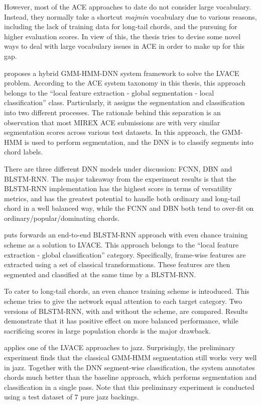 However, most of the ACE approaches to date do not consider large vocabulary. Instead, they normally take a shortcut \textit{majmin} vocabulary due to various reasons, including the lack of training data for long-tail chords, and the pursuing for higher evaluation scores. In view of this, the thesis tries to devise some novel ways to deal with large vocabulary issues in ACE in order to make up for this gap.

 proposes a hybrid GMM-HMM-DNN system framework to solve the LVACE problem. According to the ACE system taxonomy in this thesis, this approach belongs to the ``local feature extraction - global segmentation - local classification'' class. Particularly, it assigns the segmentation and classification into two different processes. The rationale behind this separation is an observation that most MIREX ACE submissions are with very similar segmentation scores across various test datasets. In this approach, the GMM-HMM is used to perform segmentation, and the DNN is to classify segments into chord labels.

There are three different DNN models under discussion: FCNN, DBN and BLSTM-RNN. The major takeaway from the experiment results is that the BLSTM-RNN implementation has the highest score in terms of versatility metrics, and has the greatest potential to handle both ordinary and long-tail chord in a well balanced way, while the FCNN and DBN both tend to over-fit on ordinary/popular/dominating chords.

 puts forwards an end-to-end BLSTM-RNN approach with even chance training scheme as a solution to LVACE. This approach belongs to the ``local feature extraction - global classification'' category. Specifically, frame-wise features are extracted using a set of classical transformations. These features are then segmented and classified at the same time by a BLSTM-RNN.

To cater to long-tail chords, an even chance training scheme is introduced. This scheme tries to give the network equal attention to each target category. Two versions of BLSTM-RNN, with and without the scheme, are compared. Results demonstrate that it has positive effect on more balanced performance, while sacrificing scores in large population chords is the major drawback.

 applies one of the LVACE approaches to jazz. Surprisingly, the preliminary experiment finds that the classical GMM-HMM segmentation still works very well in jazz. Together with the DNN segment-wise classification, the system annotates chords much better than the baseline approach, which performs segmentation and classification in a single pass. Note that this preliminary experiment is conducted using a test dataset of 7 pure jazz backings.

